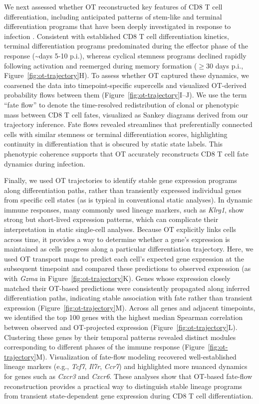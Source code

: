 We next assessed whether OT reconstructed key features of CD8 T cell differentiation, including anticipated patterns of stem-like and terminal differentiation programs that have been deeply investigated in response to infection \citep{changMolecularRegulationEffector2014}. Consistent with established CD8 T cell differentiation kinetics, terminal differentiation programs predominated during the effector phase of the response (\textasciitilde{}days 5-10 p.i.), whereas cyclical stemness programs declined rapidly following activation and reemerged during memory formation ($\geq$30 days p.i., Figure~\ref{fig:ot-trajectory}H). To assess whether OT captured these dynamics, we coarsened the data into timepoint-specific supercells and visualized OT-derived probability flows between them (Figure~\ref{fig:ot-trajectory}I--J). We use the term ``fate flow'' to denote the time-resolved redistribution of clonal or phenotypic mass between CD8 T cell fates, visualized as Sankey diagrams derived from our trajectory inference. Fate flows revealed streamlines that preferentially connected cells with similar stemness or terminal differentiation scores, highlighting continuity in differentiation that is obscured by static state labels. This phenotypic coherence supports that OT accurately reconstructs CD8 T cell fate dynamics during infection.

Finally, we used OT trajectories to identify stable gene expression programs along differentiation paths, rather than transiently expressed individual genes from specific cell states (as is typical in conventional static analyses). In dynamic immune responses, many commonly used lineage markers, such as \emph{Klrg1}, show strong but short-lived expression patterns, which can complicate their interpretation in static single-cell analyses. Because OT explicitly links cells across time, it provides a way to determine whether a gene's expression is maintained as cells progress along a particular differentiation trajectory. Here, we used OT transport maps to predict each cell's expected gene expression at the subsequent timepoint and compared these predictions to observed expression (as with \emph{Gzma} in Figure~\ref{fig:ot-trajectory}K). Genes whose expression closely matched their OT-based predictions were consistently propagated along inferred differentiation paths, indicating stable association with fate rather than transient expression (Figure~\ref{fig:ot-trajectory}M). Across all genes and adjacent timepoints, we identified the top 100 genes with the highest median Spearman correlation between observed and OT-projected expression (Figure~\ref{fig:ot-trajectory}L). Clustering these genes by their temporal patterns revealed distinct modules corresponding to different phases of the immune response (Figure~\ref{fig:ot-trajectory}M). Visualization of fate-flow modeling recovered well-established lineage markers (e.g., \emph{Tcf7}, \emph{Il7r}, \emph{Ccr7}) and highlighted more nuanced dynamics for genes such as \emph{Cxcr3} and \emph{Cxcr6}. These analyses show that OT-based fate-flow reconstruction provides a practical way to distinguish stable lineage programs from transient state-dependent gene expression during CD8 T cell differentiation.

